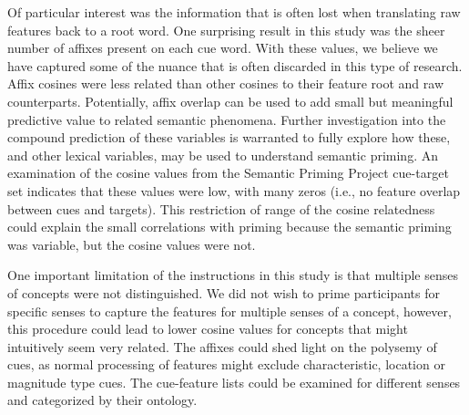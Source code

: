 \documentclass[english,,man]{apa6}
\begin{document}
Of particular interest was the information that is often lost when translating raw features back to a root word. One surprising result in this study was the sheer number of affixes present on each cue word. With these values, we believe we have captured some of the nuance that is often discarded in this type of research. Affix cosines were less related than other cosines to their feature root and raw counterparts. Potentially, affix overlap can be used to add small but meaningful predictive value to related semantic phenomena. Further investigation into the compound prediction of these variables is warranted to fully explore how these, and other lexical variables, may be used to understand semantic priming. An examination of the cosine values from the Semantic Priming Project cue-target set indicates that these values were low, with many zeros (i.e., no feature overlap between cues and targets). This restriction of range of the cosine relatedness could explain the small correlations with priming because the semantic priming was variable, but the cosine values were not.

One important limitation of the instructions in this study is that multiple senses of concepts were not distinguished. We did not wish to prime participants for specific senses to capture the features for multiple senses of a concept, however, this procedure could lead to lower cosine values for concepts that might intuitively seem very related. The affixes could shed light on the polysemy of cues, as normal processing of features might exclude characteristic, location or magnitude type cues. The cue-feature lists could be examined for different senses and categorized by their ontology.
\end{document}
